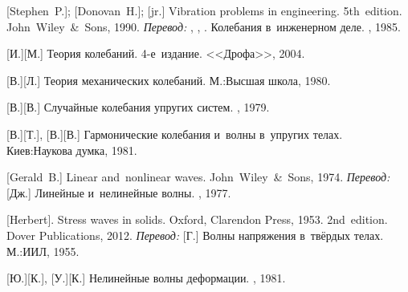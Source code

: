\begin{thebibliography}{123}
\begin{otherlanguage}{russian}
%
%



[Stephen~P.];
[Donovan~H.];
[jr.]
Vibration problems in engineering.
5th~edition.
John~Wiley~\&~Sons, 1990.
\emph{Перевод:} ,
,
.
Колебания в~инженерном деле.
\maschinenbaumoskauerverlag, 1985.

[И.][М.] Теория колебаний. 4\hbox{-}е~издание. <<Дрофа>>, 2004. 

[В.][Л.] Теория механических колебаний. М.:\;Высшая школа, 1980. 

[В.][В.] Случайные колебания упругих систем. \naukapublisher, 1979. 

[В.][Т.], [В.][В.] Гармонические колебания и~волны в~упругих телах. Киев:\;Наукова думка, 1981. 

[Gerald~B.] Linear and~nonlinear waves. John~Wiley~\&~Sons, 1974. 
\emph{Перевод:} [Дж.] Линейные и~нелинейные волны. \mirpublisher, 1977. 

[Herbert]. Stress waves in solids. Oxford, Clarendon Press, 1953.  2nd~edition. Dover Publications, 2012. 
\emph{Перевод:} [Г.] Волны напряжения в~твёрдых телах. М.:\;ИИЛ, 1955. 

[Ю.][К.], [У.][К.] Нелинейные волны деформации. \naukapublisher, 1981. 


\end{otherlanguage}
\end{thebibliography}
